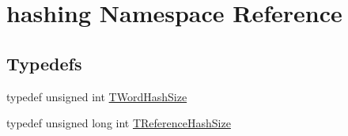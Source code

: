 \hypertarget{namespacehashing}{}\section{hashing Namespace Reference}
\label{namespacehashing}
\subsection*{Typedefs}
\begin{DoxyCompactItemize}
\item 
typedef unsigned int \hyperlink{namespacehashing_aa08467967a260f22e9dcf6983aa38c81}{T\+Word\+Hash\+Size}
\item 
typedef unsigned long int \hyperlink{namespacehashing_a0c0f51ea23331c249e570f323e48056c}{T\+Reference\+Hash\+Size}
\end{DoxyCompactItemize}

